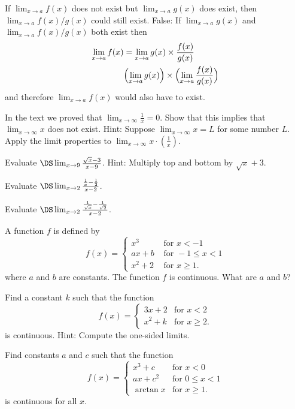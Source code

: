 \subprob If $\lim_{x\to a} f(x)$ does not exist but $\lim_{x\to a} g(x)$ does
exist, then $\lim_{x\to a} f(x)/g(x)$ could still exist.
\answer
False:  If $\lim_{x\to a} g(x)$ and $\lim_{x\to a} f(x)/g(x)$ both exist then
\begin{align*}
  \lim_{x\to a} f(x) &=
  \lim_{x\to a} g(x) \times \frac{f(x)}{g(x)} \\
  &\Bigl(\lim_{x\to a} g(x)\Bigr) \times \Bigl(\lim_{x\to a} \frac{f(x)}{g(x)}\Bigr) \\
\end{align*}
and therefore $\lim_{x\to a} f(x)$ would also have to exist.
\endanswer

\problem \label{ex:limx-dne} \groupproblem In the text we proved that
$\lim_{x\to\infty} \frac1x=0$.  Show that this implies that
$\lim_{x\to\infty}x$ does not exist.  Hint: Suppose $\lim_{x\to\infty}x =
L$ for some number $L$.  Apply the limit properties to
$\lim_{x\to\infty}x\cdot (\frac1x)$.
\bigskip

\begin{multicols}{2}\setlength{\parindent}{0pt}
\problem Evaluate $\DS \lim_{x\to 9}\frac{\sqrt x- 3}{x-9}$.  Hint: Multiply top
and bottom by $\sqrt x+3$.

\problem Evaluate $\DS \lim_{x\to 2}\frac{\frac1x-\frac12}{x-2}$.

\problem  Evaluate $\DS \lim_{x\to 2}\frac{\frac1{\sqrt{x}}-\frac1{\sqrt2}}{x-2}$.

\problem  A function $f$ is defined by
\[
f(x)= \begin{cases}
  x^3 & \text{ for } x<-1\\
  ax+b & \text{ for } -1 \leq x <1\\
  x^2 +2 & \text{ for } x \geq 1.
\end{cases}
\]
where $a$ and $b$ are constants.  The function $f$ is continuous. What
are $a$ and $b$?

\problem Find a constant $k$ such that the function
\[
f(x)= \begin{cases}
  3x+2 & \text{for }   x <2\\
  x^2 +k & \text{for }x \geq 2.
\end{cases}
\]
is continuous.  Hint: Compute the one-sided limits.

\problem Find constants $a$ and $c$ such that the function
\[
f(x)=
\begin{cases}
  x^3+c & \text{for } x<0\\
  ax+c^2 & \text{for } 0 \leq x <1\\
  \arctan x & \text{for }x \geq 1.
\end{cases}
\]
is continuous for all $x$.

\end{multicols}


